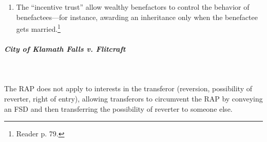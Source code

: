 \begin{enumerate}
    \item The ``incentive trust'' allow wealthy benefactors to control the 
    behavior of benefactees---for instance, awarding an inheritance only when 
    the benefactee gets married.\footnote{Reader p. 79.}
\end{enumerate}

\paragraph{\emph{City of Klamath Falls v. Flitcraft}}
~\\\\
The RAP does not apply to interests in the transferor (reversion, possibility 
of reverter, right of entry), allowing transferors to circumvent the RAP by 
conveying an FSD and then transferring the possibility of reverter to someone 
else.

